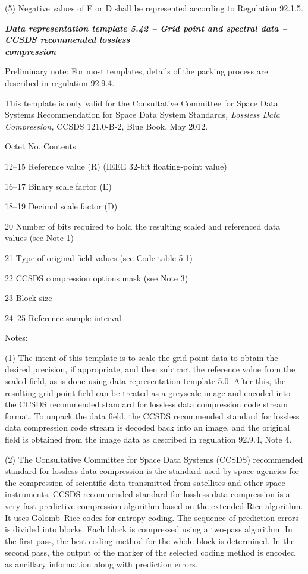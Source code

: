 (5) Negative values of E or D shall be represented according to Regulation 92.1.5.

\emph{\textbf{Data representation template 5.42 -- Grid point and spectral data -- CCSDS recommended lossless\\
compression}}

Preliminary note: For most templates, details of the packing process are described in regulation 92.9.4.

This template is only valid for the Consultative Committee for Space Data Systems Recommendation for Space Data System Standards\emph{, Lossless Data Compression,} CCSDS 121.0-B-2, Blue Book, May 2012.

Octet No. Contents

12--15 Reference value (R) (IEEE 32-bit floating-point value)

16--17 Binary scale factor (E)

18--19 Decimal scale factor (D)

20 Number of bits required to hold the resulting scaled and referenced data values (see Note 1)

21 Type of original field values (see Code table 5.1)

22 CCSDS compression options mask (see Note 3)

23 Block size

24--25 Reference sample interval

Notes:

(1) The intent of this template is to scale the grid point data to obtain the desired precision, if appropriate, and then subtract the reference value from the scaled field, as is done using data representation template 5.0. After this, the resulting grid point field can be treated as a greyscale image and encoded into the CCSDS recommended standard for lossless data compression code stream format. To unpack the data field, the CCSDS recommended standard for lossless data compression code stream is decoded back into an image, and the original field is obtained from the image data as described in regulation 92.9.4, Note 4.

(2) The Consultative Committee for Space Data Systems (CCSDS) recommended standard for lossless data compression is the standard used by space agencies for the compression of scientific data transmitted from satellites and other space instruments. CCSDS recommended standard for lossless data compression is a very fast predictive compression algorithm based on the extended-Rice algorithm. It uses Golomb--Rice codes for entropy coding. The sequence of prediction errors is divided into blocks. Each block is compressed using a two-pass algorithm. In the first pass, the best coding method for the whole block is determined. In the second pass, the output of the marker of the selected coding method is encoded as ancillary information along with prediction errors.

